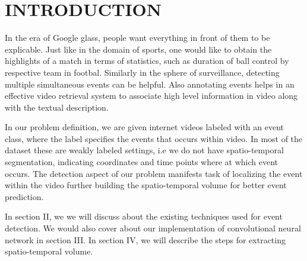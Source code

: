 \chapter{INTRODUCTION}
 \label{chap:intro}
 In the era of Google glass, people want everything in front of them to be explicable. Just like in the domain of sports, one would like to obtain the highlights of a match in terms of statistics, such as duration of ball control by respective team in footbal. Similarly in the sphere of surveillance, detecting multiple simultaneous events can be helpful. Also annotating events helps in an effective video retrieval system to associate high level information in video along with the textual description.
\par In our problem definition, we are given internet  videos labeled with an event class, where the label specifies the events that occurs within video. In most of the dataset these are weakly labeled settings, i.e we do not have spatio-temporal segmentation, indicating coordinates and time points where at  which event occurs.  The detection aspect of our problem manifests task of localizing the event within the video further building the spatio-temporal volume for better event prediction.
\par In section II, we we will discuss about the existing techniques used for event detection. We would also cover about our implementation of convolutional neural network in section III. In section IV, we will describe the steps for extracting spatio-temporal volume.
